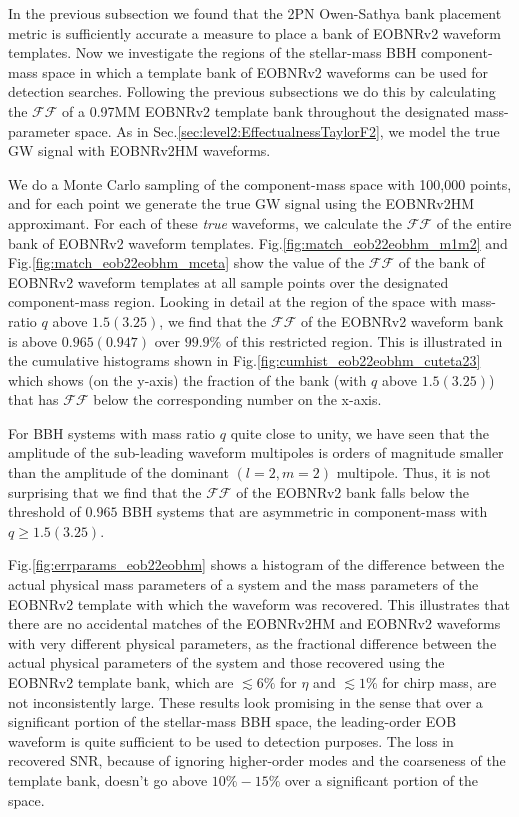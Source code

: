 \documentclass[aps,
prd,
amsmath,
amssymb,
twocolumn,
floatfix,
groupedaddress]{revtex4-1}
\newcommand{\FF}{\mathcal{FF}}
\newcommand{\MM}{\mathrm{MM}}
\begin{document}
In the previous subsection we found that the 2PN Owen-Sathya bank placement metric is sufficiently accurate a measure to place a bank of EOBNRv2 waveform templates. Now we investigate the regions of the stellar-mass BBH component-mass space in which a template bank of EOBNRv2 waveforms can be used for detection searches. Following the previous subsections we do this by calculating the $\mathcal{FF}$ of a 0.97$\MM$ EOBNRv2 template bank throughout the designated mass-parameter space. As in Sec.\ref{sec:level2:EffectualnessTaylorF2}, we model the true GW signal with EOBNRv2HM waveforms. 

We do a Monte Carlo sampling of the component-mass space with 100,000 points, and for each point we generate the true GW signal using the EOBNRv2HM approximant. For each of these \textit{true} waveforms, we calculate the $\FF$ of the entire bank of EOBNRv2 waveform templates. Fig.\ref{fig:match_eob22eobhm_m1m2} and Fig.\ref{fig:match_eob22eobhm_mceta} show the value of the $\FF$ of the bank of EOBNRv2 waveform templates at all sample points over the designated component-mass region. Looking in detail at the region of the space with mass-ratio $q$ above $1.5 (3.25)$, we find that the $\FF$ of the EOBNRv2 waveform bank is above $0.965 (0.947)$ over $99.9\%$ of this restricted region. This is illustrated in the cumulative histograms shown in Fig.\ref{fig:cumhist_eob22eobhm_cuteta23} which shows (on the y-axis) the fraction of the bank (with $q$ above $1.5 (3.25)$) that has $\FF$ below the corresponding number on the x-axis. 

For BBH systems with mass ratio $q$ quite close to unity, we have seen that the amplitude of the sub-leading waveform multipoles is orders of magnitude smaller than the amplitude of the dominant $(l=2,m=2)$ multipole. Thus, it is not surprising that we find that the $\FF$ of the EOBNRv2 bank falls below the threshold of $0.965$ BBH systems that are asymmetric in component-mass with $q\geq 1.5 (3.25)$.

Fig.\ref{fig:errparams_eob22eobhm} shows a histogram of the difference between the actual physical mass parameters of a system and the mass parameters of the EOBNRv2 template with which the waveform was recovered. This illustrates that there are no accidental matches of the EOBNRv2HM and EOBNRv2 waveforms with very different physical parameters, as the fractional difference between the actual physical parameters of the system and those recovered using the EOBNRv2 template bank, which are $\lesssim 6\%$ for $\eta$ and $\lesssim 1\%$ for chirp mass, are not inconsistently large. These results look promising in the sense that over a significant portion of the stellar-mass BBH space, the leading-order EOB waveform is quite sufficient to be used to detection purposes. The loss in recovered SNR, because of ignoring higher-order modes and the coarseness of the template bank, doesn't go above $10\%-15\%$ over a significant portion of the space.
\end{document}
